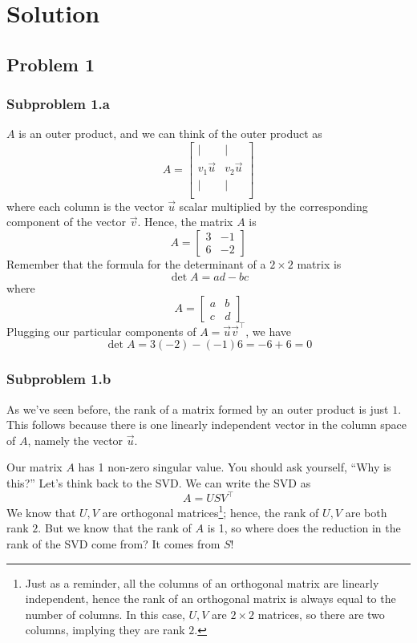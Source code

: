 \documentclass[11pt]{article}
\begin{document}
\section*{Solution}
\subsection*{Problem 1}
\subsubsection*{Subproblem 1.a}
$A$ is an outer product, and we can think of the outer product as 
\[
A = \begin{bmatrix}
    \mid & \mid \\
    v_1\vec{u} & v_2\vec{u}\\
    \mid & \mid \\
\end{bmatrix}
\]
where each column is the vector $\vec{u}$ scalar multiplied by the corresponding component of the vector $\vec{v}$. Hence, the matrix $A$ is 
\[
A = \begin{bmatrix}
    3 & -1\\ 6 & -2
\end{bmatrix}
\]
Remember that the formula for the determinant of a $2\times 2$ matrix is 
\[
\det A = ad - bc
\]
where 
\[
A = \begin{bmatrix}
    a & b \\ c & d
\end{bmatrix}
\]
Plugging our particular components of $A=\vec{u}\vec{v}^\top$, we have 
\[
\det A = 3\left(-2\right) - \left(-1\right)6 = -6 + 6 = 0
\]

\subsubsection*{Subproblem 1.b}
As we've seen before, the rank of a matrix formed by an outer product is just $1$. This follows because there is one linearly independent vector in the column space of $A$, namely the vector $\vec{u}$.

Our matrix $A$ has 1 non-zero singular value. You should ask yourself, ``Why is this?'' Let's think back to the SVD. We can write the SVD as 
\[
A = USV^\top
\]
We know that $U,V$ are orthogonal matrices\footnote{Just as a reminder, all the columns of an orthogonal matrix are linearly independent, hence the rank of an orthogonal matrix is always equal to the number of columns. In this case, $U,V$ are $2\times 2$ matrices, so there are two columns, implying they are rank $2$.}; hence, the rank of $U,V$ are both rank $2$. But we know that the rank of $A$ is 1, so where does the reduction in the rank of the SVD come from? It comes from $S$!
\end{document}
